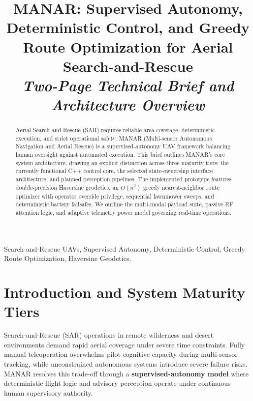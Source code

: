 \documentclass[conference]{IEEEtran}
\begin{document}
\title{MANAR: Supervised Autonomy, Deterministic Control, and Greedy Route Optimization for Aerial Search-and-Rescue\\
\Large\textit{Two-Page Technical Brief and Architecture Overview}}

\author{
}

\maketitle

\begin{abstract}
Aerial Search-and-Rescue (SAR) requires reliable area coverage, deterministic execution, and strict operational safety. MANAR (Multi-sensor Autonomous Navigation and Aerial Rescue) is a supervised-autonomy UAV framework balancing human oversight against automated execution. This brief outlines MANAR's core system architecture, drawing an explicit distinction across three maturity tiers: the currently functional C++ control core, the selected state-ownership interface architecture, and planned perception pipelines. The implemented prototype features double-precision Haversine geodetics, an $O(n^2)$ greedy nearest-neighbor route optimizer with operator override privilege, sequential lawnmower sweeps, and deterministic battery failsafes. We outline the multi-modal payload suite, passive RF attention logic, and adaptive telemetry power model governing real-time operations.
\end{abstract}

\begin{IEEEkeywords}
Search-and-Rescue UAVs, Supervised Autonomy, Deterministic Control, Greedy Route Optimization, Haversine Geodetics.
\end{IEEEkeywords}

\section{Introduction and System Maturity Tiers}
Search-and-Rescue (SAR) operations in remote wilderness and desert environments demand rapid aerial coverage under severe time constraints. Fully manual teleoperation overwhelms pilot cognitive capacity during multi-sensor tracking, while unconstrained autonomous systems introduce severe failure risks. MANAR resolves this trade-off through a \textbf{supervised-autonomy model} where deterministic flight logic and advisory perception operate under continuous human supervisory authority.
\end{document}
